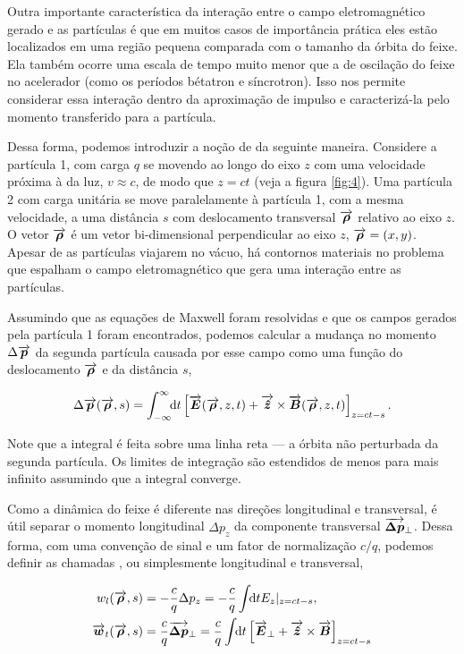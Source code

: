 \documentclass[
	12pt,				%
	openright,			%
	oneside,			%
	a4paper,		%
	chapter=TITLE,		%
	section=TITLE,		%
    brazil,				%
	english,			%
	sumario=tradicional,
	]{abntex2}
\begin{document}
Outra importante característica da interação entre o campo eletromagnético gerado e as partículas é que em muitos casos de importância prática eles estão localizados em uma região pequena comparada com o tamanho da órbita do feixe. Ela também ocorre uma escala de tempo muito menor que a de oscilação do feixe no acelerador (como os períodos bétatron e síncrotron). Isso nos permite considerar essa interação dentro da aproximação de impulso e caracterizá-la pelo momento transferido para a partícula.

Dessa forma, podemos introduzir a noção de  da seguinte maneira. Considere a partícula 1, com carga $q$ se movendo ao longo do eixo $z$ com uma velocidade próxima à da luz, $v\approx c$, de modo que $z=ct$ (veja a figura \ref{fig:4}). Uma partícula 2 com carga unitária se move paralelamente à partícula 1, com a mesma velocidade, a uma distância $s$ com deslocamento transversal $\vect{\rho}$ relativo ao eixo $z$. O vetor $\vect{\rho}$ é um vetor bi-dimensional perpendicular ao eixo $z$, $\vect{\rho} = (x,y)$. Apesar de as partículas viajarem no vácuo, há contornos materiais no problema que espalham o campo eletromagnético que gera uma interação entre as partículas.

Assumindo que as equações de Maxwell foram resolvidas e que os campos gerados pela partícula 1 foram encontrados, podemos calcular a mudança no momento $\Delta \vect{p}$ da segunda partícula causada por esse campo como uma função do deslocamento $\vect{\rho}$ e da distância $s$,

\begin{equation}
 \Delta \vect{p}(\vect{\rho},s) = \defint{t}{\left[\vect{E}(\vect{\rho},z,t) + \vect{\hat{z}}\times \vect{B}(\vect{\rho},z,t)\right]_{z=ct-s}}{-\infty}{\infty}.
\end{equation}

Note que a integral é feita sobre uma linha reta --- a órbita não perturbada da segunda partícula. Os limites de integração são estendidos de menos para mais infinito assumindo que a integral converge.

Como a dinâmica do feixe é diferente nas direções longitudinal e transversal, é útil separar o momento longitudinal $\Delta p_z$ da componente transversal $\vect{\Delta p}_\perp$. Dessa forma, com uma convenção de sinal e um fator de normalização $c/q$, podemos definir as chamadas , ou simplesmente  longitudinal e transversal,

\begin{equation}\label{eq:wake_definition}\begin{aligned}
    w_l(\vect{\rho},s) &= -\frac{c}{q} \Delta p_z = -\frac{c}{q} \udefint{t}{E_z|_{z=ct-s}}, \\
    \vect{w}_t(\vect{\rho},s) &= \frac{c}{q} \vect{\Delta p}_\perp = \frac{c}{q} \udefint{t}{\left[\vect{E}_\perp + \vect{\hat{z}}\times \vect{B}\right]_{z=ct-s}}
\end{aligned}\end{equation}
\end{document}
